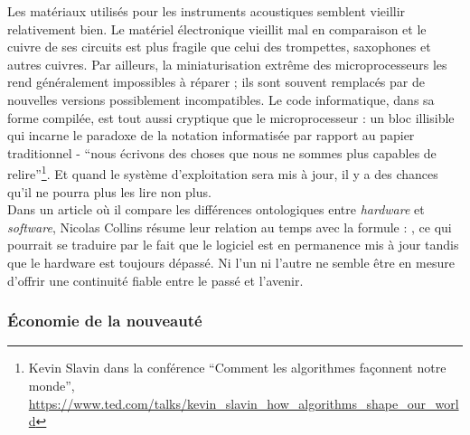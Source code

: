 \noindent Les matériaux utilisés pour les instruments acoustiques semblent vieillir relativement bien. Le matériel électronique vieillit mal en comparaison et le cuivre de ses circuits est plus fragile que celui des trompettes, saxophones et autres cuivres. Par ailleurs, la miniaturisation extrême des microprocesseurs les rend généralement impossibles à réparer ; ils sont souvent remplacés par de nouvelles versions possiblement incompatibles. Le code informatique, dans sa forme compilée, est tout aussi cryptique que le microprocesseur : un bloc illisible qui incarne le paradoxe de la notation informatisée par rapport au papier traditionnel - ``nous écrivons des choses que nous ne sommes plus capables de relire''\footnote{Kevin Slavin dans la conférence ``Comment les algorithmes façonnent notre monde'', \url{https://www.ted.com/talks/kevin_slavin_how_algorithms_shape_our_world}}. Et quand le système d'exploitation sera mis à jour, il y a des chances qu'il ne pourra plus les lire non plus.\\
\indent Dans un article où il compare les différences ontologiques entre \textit{hardware} et \textit{software}, Nicolas Collins \cite{collins_semiconducting_2013} résume leur relation au temps avec la formule : , ce qui pourrait se traduire par le fait que le logiciel est en permanence mis à jour tandis que le hardware est toujours dépassé. Ni l'un ni l'autre ne semble être en mesure d'offrir une continuité fiable entre le passé et l'avenir.

	
\subsubsection{Économie de la nouveauté}

